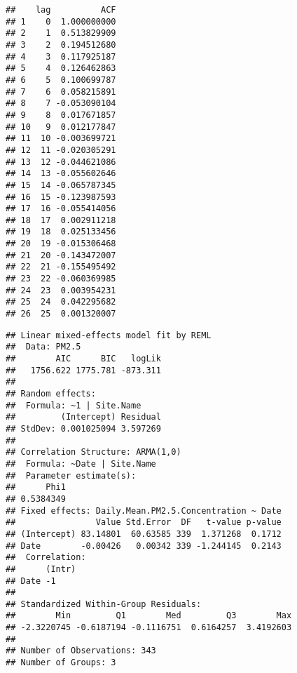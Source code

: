 \documentclass[]{article}
\newenvironment{Shaded}{\begin{snugshade}}{\end{snugshade}}
\newcommand{\KeywordTok}[1]{\textcolor[rgb]{0.13,0.29,0.53}{\textbf{#1}}}
\newcommand{\DataTypeTok}[1]{\textcolor[rgb]{0.13,0.29,0.53}{#1}}
\newcommand{\DecValTok}[1]{\textcolor[rgb]{0.00,0.00,0.81}{#1}}
\newcommand{\FloatTok}[1]{\textcolor[rgb]{0.00,0.00,0.81}{#1}}
\newcommand{\StringTok}[1]{\textcolor[rgb]{0.31,0.60,0.02}{#1}}
\newcommand{\CommentTok}[1]{\textcolor[rgb]{0.56,0.35,0.01}{\textit{#1}}}
\newcommand{\OperatorTok}[1]{\textcolor[rgb]{0.81,0.36,0.00}{\textbf{#1}}}
\newcommand{\NormalTok}[1]{#1}
\begin{document}
\begin{verbatim}
##    lag          ACF
## 1    0  1.000000000
## 2    1  0.513829909
## 3    2  0.194512680
## 4    3  0.117925187
## 5    4  0.126462863
## 6    5  0.100699787
## 7    6  0.058215891
## 8    7 -0.053090104
## 9    8  0.017671857
## 10   9  0.012177847
## 11  10 -0.003699721
## 12  11 -0.020305291
## 13  12 -0.044621086
## 14  13 -0.055602646
## 15  14 -0.065787345
## 16  15 -0.123987593
## 17  16 -0.055414056
## 18  17  0.002911218
## 19  18  0.025133456
## 20  19 -0.015306468
## 21  20 -0.143472007
## 22  21 -0.155495492
## 23  22 -0.060369985
## 24  23  0.003954231
## 25  24  0.042295682
## 26  25  0.001320007
\end{verbatim}

\begin{Shaded}
\end{Shaded}

\begin{verbatim}
## Linear mixed-effects model fit by REML
##  Data: PM2.5 
##        AIC      BIC   logLik
##   1756.622 1775.781 -873.311
## 
## Random effects:
##  Formula: ~1 | Site.Name
##         (Intercept) Residual
## StdDev: 0.001025094 3.597269
## 
## Correlation Structure: ARMA(1,0)
##  Formula: ~Date | Site.Name 
##  Parameter estimate(s):
##      Phi1 
## 0.5384349 
## Fixed effects: Daily.Mean.PM2.5.Concentration ~ Date 
##                Value Std.Error  DF   t-value p-value
## (Intercept) 83.14801  60.63585 339  1.371268  0.1712
## Date        -0.00426   0.00342 339 -1.244145  0.2143
##  Correlation: 
##      (Intr)
## Date -1    
## 
## Standardized Within-Group Residuals:
##        Min         Q1        Med         Q3        Max 
## -2.3220745 -0.6187194 -0.1116751  0.6164257  3.4192603 
## 
## Number of Observations: 343
## Number of Groups: 3
\end{verbatim}
\end{document}
